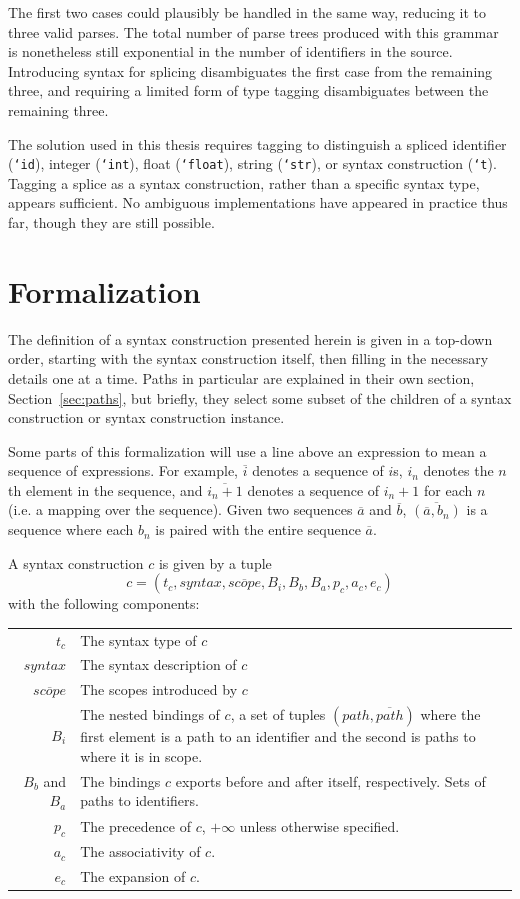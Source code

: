 \documentclass{kththesis}
\begin{document}
The first two cases could plausibly be handled in the same way, reducing it to three valid parses. The total number of parse trees produced with this grammar is nonetheless still exponential in the number of identifiers in the source. Introducing syntax for splicing disambiguates the first case from the remaining three, and requiring a limited form of type tagging disambiguates between the remaining three.

The solution used in this thesis requires tagging to distinguish a spliced identifier (\texttt{`id}), integer (\texttt{`int}), float (\texttt{`float}), string (\texttt{`str}), or syntax construction (\texttt{`t}). Tagging a splice as a syntax construction, rather than a specific syntax type, appears sufficient. No ambiguous implementations have appeared in practice thus far, though they are still possible.

\chapter{Formalization} \label{sec:formalization}

The definition of a syntax construction presented herein is given in a top-down order, starting with the syntax construction itself, then filling in the necessary details one at a time. Paths in particular are explained in their own section, Section~\ref{sec:paths}, but briefly, they select some subset of the children of a syntax construction or syntax construction instance.

Some parts of this formalization will use a line above an expression to mean a sequence of expressions. For example, $\overline{i}$ denotes a sequence of $i$s, $i_n$ denotes the $n$th element in the sequence, and $\overline{i_n + 1}$ denotes a sequence of $i_n + 1$ for each $n$ (i.e. a mapping over the sequence). Given two sequences $\overline{a}$ and $\overline{b}$, $\overline{(\overline{a}, b_n)}$ is a sequence where each $b_n$ is paired with the entire sequence $\overline{a}$.

A syntax construction $c$ is given by a tuple
$$ c = (t_c, syntax, \overline{scope}, B_i, B_b, B_a, p_c, a_c, e_c) $$
with the following components:

\begin{tabular}{r|p{10cm}}
$t_c$ & The syntax type of $c$ \\
$syntax$ & The syntax description of $c$ \\
$\overline{scope}$ & The scopes introduced by $c$ \\
$B_i$ & The nested bindings of $c$, a set of tuples $(path, \overline{path})$ where the first element is a path to an identifier and the second is paths to where it is in scope. \\
$B_b$ and $B_a$ & The bindings $c$ exports before and after itself, respectively. Sets of paths to identifiers. \\
$p_c$ & The precedence of $c$, $+\infty$ unless otherwise specified. \\
$a_c$ & The associativity of $c$. \\
$e_c$ & The expansion of $c$. \\
\end{tabular}
\end{document}
